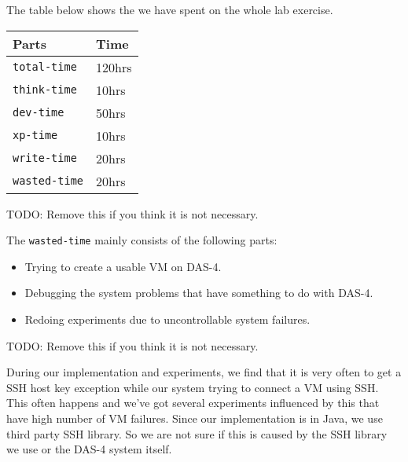 The table below shows the we have spent on the whole lab
exercise.

  \begin{center}
  \begin{tabular}{|l|l|}
    \hline
    Parts       & Time \\
    \hline
    \texttt{total-time}  & 120hrs \\
    \texttt{think-time}  & 10hrs \\
    \texttt{dev-time}    & 50hrs \\
    \texttt{xp-time}     & 10hrs \\
    \texttt{write-time}  & 20hrs \\
    \texttt{wasted-time} & 20hrs \\
    \hline
  \end{tabular}
  \end{center}

TODO: Remove this if you think it is not necessary.

The \texttt{wasted-time} mainly consists of the following parts:

\begin{itemize}
\item Trying to create a usable VM on DAS-4.
\item Debugging the system problems that have something to do with DAS-4.
\item Redoing experiments due to uncontrollable system failures.
\end{itemize}


\appendix[Feedbacks]
TODO: Remove this if you think it is not necessary.

During our implementation and experiments, we find that it is very often to
get a SSH host key exception while our system trying to connect a VM using
SSH. This often happens and we've got several experiments influenced by this
that have high number of VM failures. Since our implementation is in Java,
we use third party SSH library. So we are not sure if this is caused by
the SSH library we use or the DAS-4 system itself.


